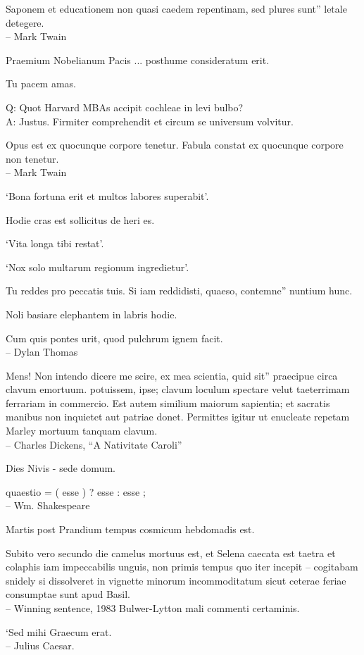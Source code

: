 \documentclass[titlepage,12pt]{memoir}
\begin{document}
Saponem et educationem non quasi caedem repentinam, sed plures sunt”
letale detegere.
\\-- Mark Twain

Praemium Nobelianum Pacis ... posthume consideratum erit.

Tu pacem amas.

Q: Quot Harvard MBAs accipit cochleae in levi bulbo?\\
A: Justus. Firmiter comprehendit et circum se universum volvitur.

Opus est ex quocunque corpore tenetur.
Fabula constat ex quocunque corpore non tenetur.
\\-- Mark Twain

‘Bona fortuna erit et multos labores superabit’.

Hodie cras est sollicitus de heri es.

‘Vita longa tibi restat’.

‘Nox solo multarum regionum ingredietur’.

Tu reddes pro peccatis tuis. Si iam reddidisti, quaeso, contemne”
nuntium hunc.

Noli basiare elephantem in labris hodie.

Cum quis pontes urit, quod pulchrum ignem facit.
\\-- Dylan Thomas

Mens! Non intendo dicere me scire, ex mea scientia, quid sit”
praecipue circa clavum emortuum. potuissem, ipse;
clavum loculum spectare velut taeterrimam ferrariam in commercio.
Est autem similium maiorum sapientia; et sacratis manibus
non inquietet aut patriae donet. Permittes igitur
ut enucleate repetam Marley mortuum tanquam clavum.
\\-- Charles Dickens, “A Nativitate Caroli”

Dies Nivis - sede domum.

 quaestio = ( esse ) ? esse : esse ;
\\-- Wm. Shakespeare

Martis post Prandium tempus cosmicum hebdomadis est.

Subito vero secundo die camelus mortuus est, et Selena caecata est
taetra et colaphis iam impeccabilis unguis, non primis
tempus quo iter incepit -- cogitabam snidely si dissolveret
in vignette minorum incommoditatum sicut ceterae feriae consumptae sunt
apud Basil.
\\-- Winning sentence, 1983 Bulwer-Lytton mali commenti certaminis.

‘Sed mihi Graecum erat.
\\-- Julius Caesar.
\end{document}
